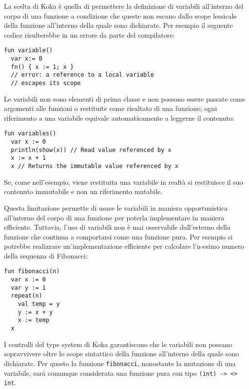 La scelta di Koka è quella di permettere la definizione di variabili all'interno del corpo di una funzione a condizione che queste non escano dallo scope lessicale della funzione all'interno della quale sono dichiarate. Per esempio il seguente codice risulterebbe in un errore da parte del compilatore:
\begin{lstlisting}[language=koka]
fun variable()
  var x:= 0
  fn() { x := 1; x }
  // error: a reference to a local variable 
  // escapes its scope
\end{lstlisting}

Le variabili non sono elementi di prima classe e non possono essere passate come argomenti alle funzioni o restituite come risultato di una funzione; ogni riferimento a una variabile equivale automaticamente a leggerne il contenuto:
\begin{lstlisting}[language=koka]
fun variables()
  var x := 0
  println(show(x)) // Read value referenced by x
  x := x + 1
  x // Returns the immutable value referenced by x
\end{lstlisting}
Se, come nell'esempio, viene restituita una variabile in realtà si restituisce il suo contenuto immutabile e non un riferimento mutabile.

Questa limitazione permette di usare le variabili in maniera opportunistica all'interno del corpo di una funzione per poterla implementare in maniera efficiente. Tuttavia, l'uso di variabili non è mai osservabile dall'esterno della funzione che continua a comportarsi come una funzione pura. Per esempio si potrebbe realizzare un'implementazione efficiente per calcolare l'n-esimo numero della sequenza di Fibonacci:
\begin{lstlisting}[language=koka]
fun fibonacci(n)
  var x := 0
  var y := 1
  repeat(n)
    val temp = y
    y := x + y
    x := temp
  x
\end{lstlisting}
I controlli del type system di Koka garantiscono che le variabili non possano sopravvivere oltre lo scope sintattico della funzione all'interno della quale sono dichiarate. Per questo la funzione \lstinline{fibonacci}, nonostante la mutazione di una variabile, sarà comunque considerata una funzione pura con tipo \lstinline{(int) -> <> int}.
